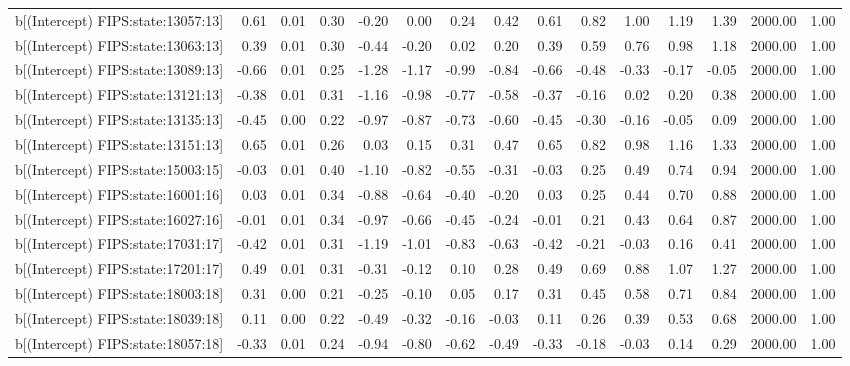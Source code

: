 \begin{table}[ht]
\begin{tabular}{rrrrrrrrrrrrrrr}
  b[(Intercept) FIPS:state:13057:13] & 0.61 & 0.01 & 0.30 & -0.20 & 0.00 & 0.24 & 0.42 & 0.61 & 0.82 & 1.00 & 1.19 & 1.39 & 2000.00 & 1.00 \\ 
  b[(Intercept) FIPS:state:13063:13] & 0.39 & 0.01 & 0.30 & -0.44 & -0.20 & 0.02 & 0.20 & 0.39 & 0.59 & 0.76 & 0.98 & 1.18 & 2000.00 & 1.00 \\ 
  b[(Intercept) FIPS:state:13089:13] & -0.66 & 0.01 & 0.25 & -1.28 & -1.17 & -0.99 & -0.84 & -0.66 & -0.48 & -0.33 & -0.17 & -0.05 & 2000.00 & 1.00 \\ 
  b[(Intercept) FIPS:state:13121:13] & -0.38 & 0.01 & 0.31 & -1.16 & -0.98 & -0.77 & -0.58 & -0.37 & -0.16 & 0.02 & 0.20 & 0.38 & 2000.00 & 1.00 \\ 
  b[(Intercept) FIPS:state:13135:13] & -0.45 & 0.00 & 0.22 & -0.97 & -0.87 & -0.73 & -0.60 & -0.45 & -0.30 & -0.16 & -0.05 & 0.09 & 2000.00 & 1.00 \\ 
  b[(Intercept) FIPS:state:13151:13] & 0.65 & 0.01 & 0.26 & 0.03 & 0.15 & 0.31 & 0.47 & 0.65 & 0.82 & 0.98 & 1.16 & 1.33 & 2000.00 & 1.00 \\ 
  b[(Intercept) FIPS:state:15003:15] & -0.03 & 0.01 & 0.40 & -1.10 & -0.82 & -0.55 & -0.31 & -0.03 & 0.25 & 0.49 & 0.74 & 0.94 & 2000.00 & 1.00 \\ 
  b[(Intercept) FIPS:state:16001:16] & 0.03 & 0.01 & 0.34 & -0.88 & -0.64 & -0.40 & -0.20 & 0.03 & 0.25 & 0.44 & 0.70 & 0.88 & 2000.00 & 1.00 \\ 
  b[(Intercept) FIPS:state:16027:16] & -0.01 & 0.01 & 0.34 & -0.97 & -0.66 & -0.45 & -0.24 & -0.01 & 0.21 & 0.43 & 0.64 & 0.87 & 2000.00 & 1.00 \\ 
  b[(Intercept) FIPS:state:17031:17] & -0.42 & 0.01 & 0.31 & -1.19 & -1.01 & -0.83 & -0.63 & -0.42 & -0.21 & -0.03 & 0.16 & 0.41 & 2000.00 & 1.00 \\ 
  b[(Intercept) FIPS:state:17201:17] & 0.49 & 0.01 & 0.31 & -0.31 & -0.12 & 0.10 & 0.28 & 0.49 & 0.69 & 0.88 & 1.07 & 1.27 & 2000.00 & 1.00 \\ 
  b[(Intercept) FIPS:state:18003:18] & 0.31 & 0.00 & 0.21 & -0.25 & -0.10 & 0.05 & 0.17 & 0.31 & 0.45 & 0.58 & 0.71 & 0.84 & 2000.00 & 1.00 \\ 
  b[(Intercept) FIPS:state:18039:18] & 0.11 & 0.00 & 0.22 & -0.49 & -0.32 & -0.16 & -0.03 & 0.11 & 0.26 & 0.39 & 0.53 & 0.68 & 2000.00 & 1.00 \\ 
  b[(Intercept) FIPS:state:18057:18] & -0.33 & 0.01 & 0.24 & -0.94 & -0.80 & -0.62 & -0.49 & -0.33 & -0.18 & -0.03 & 0.14 & 0.29 & 2000.00 & 1.00 \\ 

\end{tabular}
\end{table}
